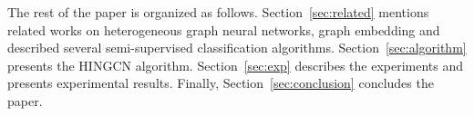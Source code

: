 The rest of the paper is organized as follows.
Section~\ref{sec:related} mentions related works on heterogeneous graph neural networks, graph embedding and described several semi-supervised classification algorithms.
Section~\ref{sec:algorithm} presents the HINGCN algorithm.
Section~\ref{sec:exp} describes the experiments and presents experimental results.
Finally, Section~\ref{sec:conclusion} concludes the paper.












